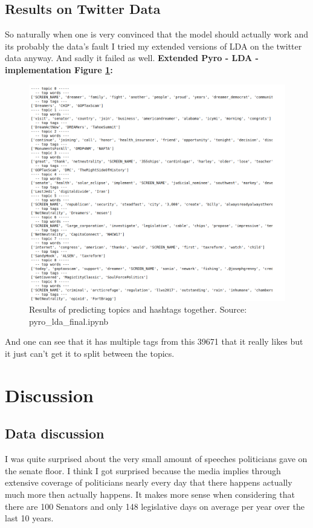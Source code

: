 \documentclass[10pt,conference,compsocconf]{IEEEtran}
\begin{document}
\subsection{Results on Twitter Data}
So naturally when one is very convinced that the model should actually work and its probably the data's fault I tried my extended versions of LDA on the twitter data anyway. And sadly it failed as well. 
\textbf{Extended Pyro - LDA - implementation Figure \ref{fig:resultldaontwitter}:}
\begin{figure}[h]
	\centering
	\includegraphics[width=0.7\linewidth]{images/result_lda_on_twitter}
	\caption{Results of predicting topics and hashtags together. Source: pyro\_lda\_final.ipynb}
	\label{fig:resultldaontwitter}
\end{figure}
And one can see that it has multiple tags from this 39671 that it really likes but it just can't get it to split between the topics. 



\section{Discussion}
\label{sec:Discussion}

\subsection{Data discussion}

I was quite surprised about the very small amount of speeches politicians gave on the senate floor. I think I got surprised because the media implies through extensive coverage of politicians nearly every day that there happens actually much more then actually happens. It makes more sense when considering that there are 100 Senators and only 148 legislative days on average per year over the last 10 years.  \\
\end{document}
